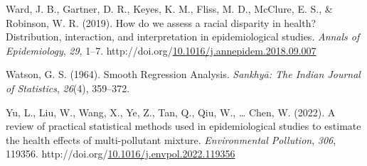 \documentclass[12pt, twoside]{amherstthesis}
\newenvironment{CSLReferences}[2]%
  {}%
  {\par}
\begin{document}
\begin{CSLReferences}{1}{0}
\leavevmode{}%
Ward, J. B., Gartner, D. R., Keyes, K. M., Fliss, M. D., McClure, E. S., \& Robinson, W. R. (2019). How do we assess a racial disparity in health? {Distribution}, interaction, and interpretation in epidemiological studies. \emph{Annals of Epidemiology}, \emph{29}, 1--7. http://doi.org/\href{https://doi.org/10.1016/j.annepidem.2018.09.007}{10.1016/j.annepidem.2018.09.007}

\leavevmode{}%
Watson, G. S. (1964). Smooth {Regression} {Analysis}. \emph{Sankhyā: The Indian Journal of Statistics}, \emph{26}(4), 359--372.

\leavevmode{}%
Yu, L., Liu, W., Wang, X., Ye, Z., Tan, Q., Qiu, W., \ldots{} Chen, W. (2022). A review of practical statistical methods used in epidemiological studies to estimate the health effects of multi-pollutant mixture. \emph{Environmental Pollution}, \emph{306}, 119356. http://doi.org/\href{https://doi.org/10.1016/j.envpol.2022.119356}{10.1016/j.envpol.2022.119356}

\end{CSLReferences}
\end{document}
